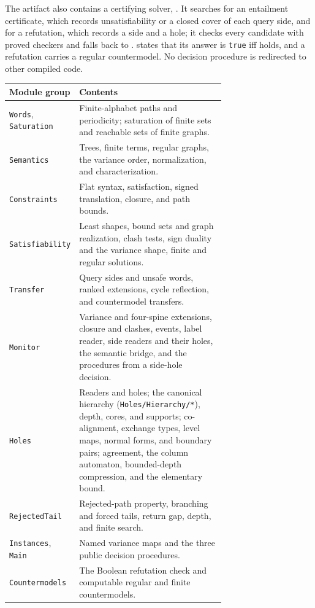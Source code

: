 The artifact also contains a certifying solver, . It searches for
an entailment certificate, which records unsatisfiability or a closed cover
of each query side, and for a refutation, which records a side and a hole;
it checks every candidate with proved checkers and falls back to
.  states
that its answer is \texttt{true} iff  holds, and a refutation
carries a regular countermodel. No decision procedure is redirected to
other compiled code.

\begin{center}\small
\begin{tabular}{@{}lp{0.70\linewidth}@{}}
\toprule
Module group & Contents\\\midrule
\texttt{Words}, \texttt{Saturation} & Finite-alphabet paths and periodicity; saturation of finite sets and reachable sets of finite graphs.\\
\texttt{Semantics} & Trees, finite terms, regular graphs, the variance order, normalization, and characterization.\\
\texttt{Constraints} & Flat syntax, satisfaction, signed translation, closure, and path bounds.\\
\texttt{Satisfiability} & Least shapes, bound sets and graph realization, clash tests, sign duality and the variance shape, finite and regular solutions.\\
\texttt{Transfer} & Query sides and unsafe words, ranked extensions, cycle reflection, and countermodel transfers.\\
\texttt{Monitor} & Variance and four-spine extensions, closure and clashes, events, label reader, side readers and their holes, the semantic bridge, and the procedures from a side-hole decision.\\
\texttt{Holes} & Readers and holes; the canonical hierarchy (\texttt{Holes/Hierarchy/*}), depth, cores, and supports; co-alignment, exchange types, level maps, normal forms, and boundary pairs; agreement, the column automaton, bounded-depth compression, and the elementary bound.\\
\texttt{RejectedTail} & Rejected-path property, branching and forced tails, return gap, depth, and finite search.\\
\texttt{Instances}, \texttt{Main} & Named variance maps and the three public decision procedures.\\
\texttt{Countermodels} & The Boolean refutation check and computable regular and finite countermodels.\\

\end{tabular}
\end{center}
